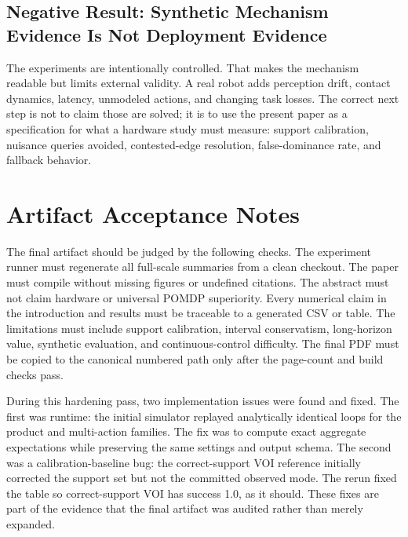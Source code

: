 \documentclass{article}
\begin{document}
\subsection{Negative Result: Synthetic Mechanism Evidence Is Not Deployment Evidence}

The experiments are intentionally controlled. That makes the mechanism readable but limits external validity. A real robot adds perception drift, contact dynamics, latency, unmodeled actions, and changing task losses. The correct next step is not to claim those are solved; it is to use the present paper as a specification for what a hardware study must measure: support calibration, nuisance queries avoided, contested-edge resolution, false-dominance rate, and fallback behavior.

\section{Artifact Acceptance Notes}

The final artifact should be judged by the following checks. The experiment runner must regenerate all full-scale summaries from a clean checkout. The paper must compile without missing figures or undefined citations. The abstract must not claim hardware or universal POMDP superiority. Every numerical claim in the introduction and results must be traceable to a generated CSV or table. The limitations must include support calibration, interval conservatism, long-horizon value, synthetic evaluation, and continuous-control difficulty. The final PDF must be copied to the canonical numbered path only after the page-count and build checks pass.

During this hardening pass, two implementation issues were found and fixed. The first was runtime: the initial simulator replayed analytically identical loops for the product and multi-action families. The fix was to compute exact aggregate expectations while preserving the same settings and output schema. The second was a calibration-baseline bug: the correct-support VOI reference initially corrected the support set but not the committed observed mode. The rerun fixed the table so correct-support VOI has success 1.0, as it should. These fixes are part of the evidence that the final artifact was audited rather than merely expanded.
\end{document}
